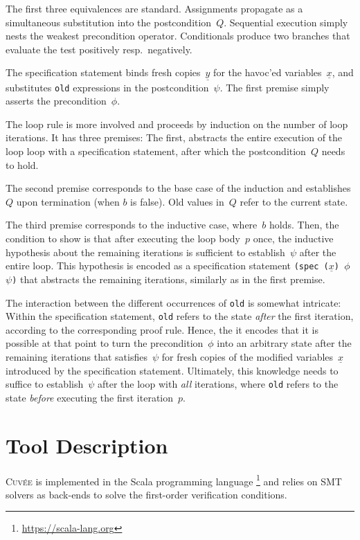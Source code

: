 \documentclass[fleqn]{llncs}
\newcommand{\Cuvee}{\textsc{Cuvée}\xspace}
\newcommand{\code}[1]{\texttt{#1}}
\newcommand{\xs}{\underline x}
\newcommand{\ys}{\underline y}
\begin{document}
The first three equivalences are standard.
Assignments propagate as a simultaneous substitution into the postcondition~$Q$.
Sequential execution simply nests the weakest precondition operator.
Conditionals produce two branches that evaluate the test positively resp.~negatively.

The specification statement binds fresh copies~$\ys$ for the havoc'ed variables~$\xs$,
and substitutes \code{old} expressions in the postcondition~$\psi$.
The first premise simply asserts the precondition~$\phi$.

\medskip

The loop rule is more involved and proceeds by induction on the number of loop iterations.
It has three premises:
The first, abstracts the entire execution of the loop loop with a specification statement,
after which the postcondition~$Q$ needs to hold.

The second premise corresponds to the base case of the induction
and establishes $Q$ upon termination (when $b$ is false).
Old values in~$Q$ refer to the current state.

The third premise corresponds to the inductive case, where~$b$ holds.
Then, the condition to show is that after executing the loop body~$p$ once,
the inductive hypothesis about the remaining iterations is sufficient to establish~$\psi$ after the entire loop.
This hypothesis is encoded as a specification statement
\code{(spec ($\xs$) $\phi$ $\psi$)}
that abstracts the remaining iterations, similarly as in the first premise.

The interaction between the different occurrences of \code{old} is somewhat intricate:
Within the specification statement, \code{old} refers to the state \emph{after} the first iteration,
according to the corresponding proof rule.
Hence, the it encodes that it is possible at that point to turn the precondition~$\phi$
into an arbitrary state after the remaining iterations that satisfies~$\psi$ for fresh copies of the modified variables~$\xs$
introduced by the specification statement.
Ultimately, this knowledge needs to suffice to establish~$\psi$ after the loop with \emph{all} iterations,
where \code{old} refers to the state \emph{before} executing the first iteration~$p$.

\section{Tool Description}
\label{sec:tool}

\Cuvee is implemented in the Scala programming language%
    \footnote{\url{https://scala-lang.org}}
and relies on SMT solvers as back-ends to solve the first-order verification conditions.
\end{document}
